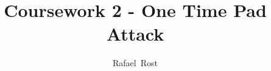 \documentclass[journal]{IEEEtran}
\begin{document}
%
\title{Coursework 2 - One Time Pad Attack}
%
%
%

\author{Rafael~Rost}

%
%



%







\end{document}
